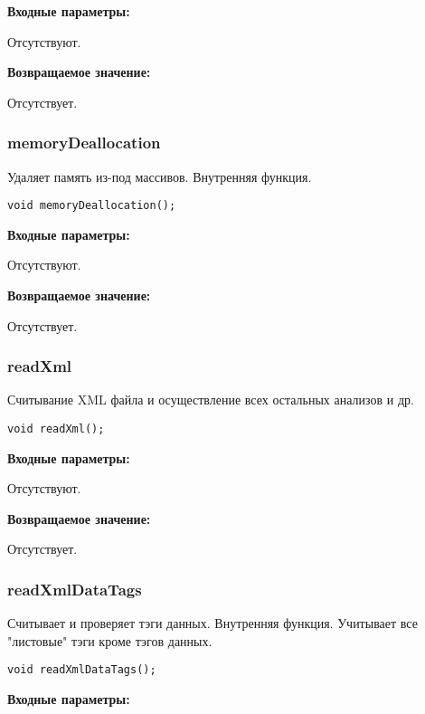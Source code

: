 \documentclass[a4paper,12pt]{article}
\begin{document}
\textbf{Входные параметры:}

Отсутствуют.

\textbf{Возвращаемое значение:}

Отсутствует.


\subsubsection{memoryDeallocation}\label{memoryDeallocation}

Удаляет память из-под массивов. Внутренняя функция.


\begin{lstlisting}[label=code_syntax_memoryDeallocation,caption=Синтаксис]
void memoryDeallocation();
\end{lstlisting}

\textbf{Входные параметры:}

Отсутствуют.

\textbf{Возвращаемое значение:}

Отсутствует.


\subsubsection{readXml}\label{readXml}

Считывание XML файла и осуществление всех остальных анализов и др.


\begin{lstlisting}[label=code_syntax_readXml,caption=Синтаксис]
void readXml();
\end{lstlisting}

\textbf{Входные параметры:}

Отсутствуют.

\textbf{Возвращаемое значение:}

Отсутствует.


\subsubsection{readXmlDataTags}\label{readXmlDataTags}

Считывает и проверяет тэги данных. Внутренняя функция. Учитывает все "листовые" тэги кроме тэгов данных.


\begin{lstlisting}[label=code_syntax_readXmlDataTags,caption=Синтаксис]
void readXmlDataTags();
\end{lstlisting}

\textbf{Входные параметры:}
\end{document}
